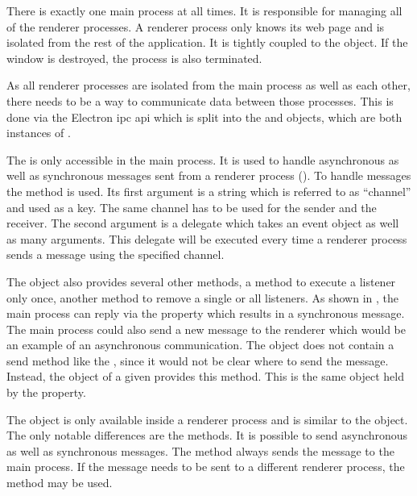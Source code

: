 There is exactly one main process at all times. It is responsible for managing all of the renderer processes. A renderer process only knows its web page and is isolated from the rest of the application. It is tightly coupled to the  object. If the window is destroyed, the process is also terminated.


As all renderer processes are isolated from the main process as well as each other, there needs to be a way to communicate data between those processes. This is done via the Electron \gls{ipc} \gls{api} which is split into the  and  objects, which are both instances of .


The  is only accessible in the main process. It is used to handle asynchronous as well as synchronous messages sent from a renderer process (). To handle messages the  method is used. Its first argument is a string which is referred to as \enquote{channel} and used as a key. The same channel has to be used for the sender and the receiver. The second argument is a delegate which takes an event object as well as many arguments. This delegate will be executed every time a renderer process sends a message using the specified channel.

The  object also provides several other methods, \zB a method to execute a listener only once, another method to remove a single or all listeners. As shown in , the main process can reply via the  property which results in a synchronous message. The main process could also send a new message to the renderer which would be an example of an asynchronous communication. The  object does not contain a send method like the , since it would not be clear where to send the message. Instead, the  object of a given  provides this method. This is the same object held by the  property. \cite{ipcMain}

The  object is only available inside a renderer process and is similar to the  object. The only notable differences are the  methods. It is possible to send asynchronous as well as synchronous messages. The  method always sends the message to the main process. If the message needs to be sent to a different renderer process, the  method may be used. \cite{ipcRenderer}

